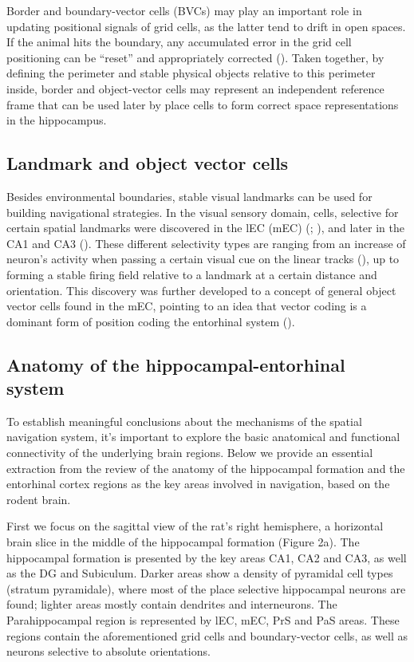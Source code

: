 Border and boundary-vector cells (BVCs) may play an important role in updating positional signals of grid cells, as the latter tend to drift in open spaces. If the animal hits the boundary, any accumulated error in the grid cell positioning can be “reset” and appropriately corrected (\cite{Hardcastle2015}). Taken together, by defining the perimeter and stable physical objects relative to this perimeter inside, border and object-vector cells may represent an independent reference frame that can be used later by place cells to form correct space representations in the hippocampus.


\subsection{Landmark and object vector cells}

Besides environmental boundaries, stable visual landmarks can be used for building navigational strategies. In the visual sensory domain, cells, selective for certain spatial landmarks were discovered in the lEC (mEC) (\cite{Deshmukh2011}; \cite{Kinkhabwala2020}), and later in the CA1 and CA3 (\cite{Deshmukh2013}). These different selectivity types are ranging from an increase of neuron’s activity when passing a certain visual cue on the linear tracks (\cite{Kinkhabwala2020}), up to forming a stable firing field relative to a landmark at a certain distance and orientation. This discovery was further developed to a concept of general object vector cells found in the mEC, pointing to an idea that vector coding is a dominant form of position coding the entorhinal system (\cite{Hooydal2019}).


\subsection{Anatomy of the hippocampal-entorhinal system}

To establish meaningful conclusions about the mechanisms of the spatial navigation system, it’s important to explore the basic anatomical and functional connectivity of the underlying brain regions. Below we provide an essential extraction from the review of the anatomy of the hippocampal formation and the entorhinal cortex regions as the key areas involved in navigation, based on the rodent brain.

First we focus on the sagittal view of the rat’s right hemisphere, a horizontal brain slice in the middle of the hippocampal formation (Figure 2a). The hippocampal formation is presented by the key areas CA1, CA2 and CA3, as well as the DG and Subiculum. Darker areas show a density of pyramidal cell types (stratum pyramidale), where most of the place selective hippocampal neurons are found; lighter areas mostly contain dendrites and interneurons. The Parahippocampal region is represented by lEC, mEC, PrS and PaS areas. These regions contain the aforementioned grid cells and boundary-vector cells, as well as neurons selective to absolute orientations.

